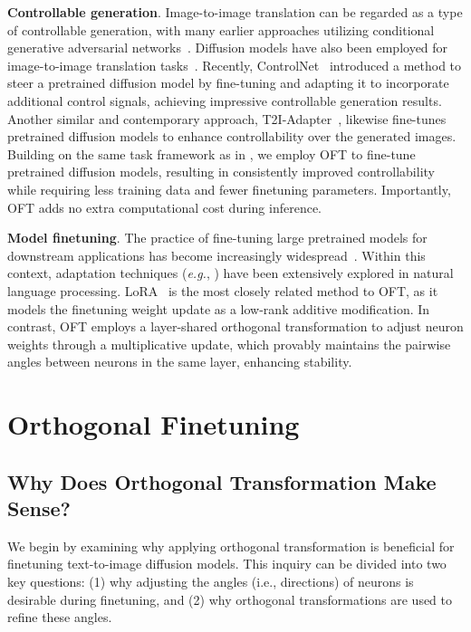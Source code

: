 \textbf{Controllable generation}. Image-to-image translation can be regarded as a type of controllable generation, with many earlier approaches utilizing conditional generative adversarial networks~\cite{isola2017image,zhu2017toward,wang2018high,park2019semantic,choi2018stargan}. Diffusion models have also been employed for image-to-image translation tasks~\cite{saharia2022palette,voynov2022sketch,wang2022pretraining}. Recently, ControlNet~\cite{zhang2023adding} introduced a method to steer a pretrained diffusion model by fine-tuning and adapting it to incorporate additional control signals, achieving impressive controllable generation results. Another similar and contemporary approach, T2I-Adapter~\cite{mou2023t2i}, likewise fine-tunes pretrained diffusion models to enhance controllability over the generated images. Building on the same task framework as in \cite{zhang2023adding,mou2023t2i}, we employ OFT to fine-tune pretrained diffusion models, resulting in consistently improved controllability while requiring less training data and fewer finetuning parameters. Importantly, OFT adds no extra computational cost during inference.

\textbf{Model finetuning}. The practice of fine-tuning large pretrained models for downstream applications has become increasingly widespread~\cite{devlin2018bert,brown2020language,he2022masked}. Within this context, adaptation techniques (\emph{e.g.}, \cite{hulora2022,houlsby2019parameter,pfeiffer2020adapterfusion}) have been extensively explored in natural language processing. LoRA~\cite{hulora2022} is the most closely related method to OFT, as it models the finetuning weight update as a low-rank additive modification. In contrast, OFT employs a layer-shared orthogonal transformation to adjust neuron weights through a multiplicative update, which provably maintains the pairwise angles between neurons in the same layer, enhancing stability.

\section{Orthogonal Finetuning}

\subsection{Why Does Orthogonal Transformation Make Sense?}

We begin by examining why applying orthogonal transformation is beneficial for finetuning text-to-image diffusion models. This inquiry can be divided into two key questions: (1) why adjusting the angles (i.e., directions) of neurons is desirable during finetuning, and (2) why orthogonal transformations are used to refine these angles.

